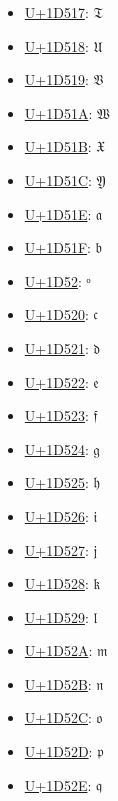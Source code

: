 \begin{itemize}
	\item \href{https://www.compart.com/en/unicode/U+1D517}{U+1D517}: 𝔗
	\item \href{https://www.compart.com/en/unicode/U+1D518}{U+1D518}: 𝔘
	\item \href{https://www.compart.com/en/unicode/U+1D519}{U+1D519}: 𝔙
	\item \href{https://www.compart.com/en/unicode/U+1D51A}{U+1D51A}: 𝔚
	\item \href{https://www.compart.com/en/unicode/U+1D51B}{U+1D51B}: 𝔛
	\item \href{https://www.compart.com/en/unicode/U+1D51C}{U+1D51C}: 𝔜
	\item \href{https://www.compart.com/en/unicode/U+1D51E}{U+1D51E}: 𝔞
	\item \href{https://www.compart.com/en/unicode/U+1D51F}{U+1D51F}: 𝔟
	\item \href{https://www.compart.com/en/unicode/U+1D52}{U+1D52}: ᵒ
	\item \href{https://www.compart.com/en/unicode/U+1D520}{U+1D520}: 𝔠
	\item \href{https://www.compart.com/en/unicode/U+1D521}{U+1D521}: 𝔡
	\item \href{https://www.compart.com/en/unicode/U+1D522}{U+1D522}: 𝔢
	\item \href{https://www.compart.com/en/unicode/U+1D523}{U+1D523}: 𝔣
	\item \href{https://www.compart.com/en/unicode/U+1D524}{U+1D524}: 𝔤
	\item \href{https://www.compart.com/en/unicode/U+1D525}{U+1D525}: 𝔥
	\item \href{https://www.compart.com/en/unicode/U+1D526}{U+1D526}: 𝔦
	\item \href{https://www.compart.com/en/unicode/U+1D527}{U+1D527}: 𝔧
	\item \href{https://www.compart.com/en/unicode/U+1D528}{U+1D528}: 𝔨
	\item \href{https://www.compart.com/en/unicode/U+1D529}{U+1D529}: 𝔩
	\item \href{https://www.compart.com/en/unicode/U+1D52A}{U+1D52A}: 𝔪
	\item \href{https://www.compart.com/en/unicode/U+1D52B}{U+1D52B}: 𝔫
	\item \href{https://www.compart.com/en/unicode/U+1D52C}{U+1D52C}: 𝔬
	\item \href{https://www.compart.com/en/unicode/U+1D52D}{U+1D52D}: 𝔭
	\item \href{https://www.compart.com/en/unicode/U+1D52E}{U+1D52E}: 𝔮

\end{itemize}
